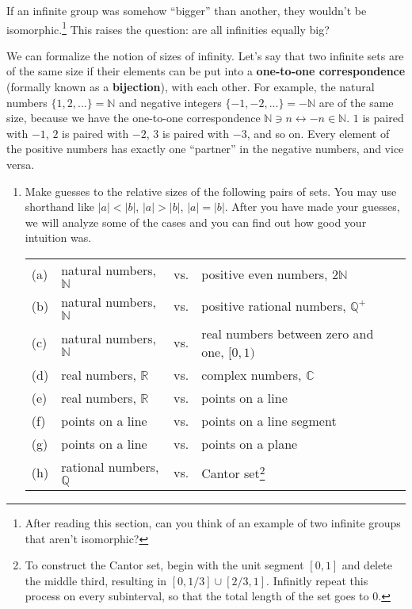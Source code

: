 \documentclass[../gatm.tex]{subfiles}
\begin{document}
If an infinite group was somehow ``bigger'' than another, they wouldn't be isomorphic.\footnote{After reading this section, can you think of an example of two infinite groups that aren't isomorphic?} This raises the question: are all infinities equally big?

We can formalize the notion of sizes of infinity. Let's say that two infinite sets are of the same size if their elements can be put into a \textbf{one-to-one correspondence} (formally known as a \textbf{bijection}), with each other. For example, the natural numbers $\{1,2,...\}=\mathbb{N}$ and negative integers $\{-1,-2,...\}=-\mathbb{N}$ are of the same size, because we have the one-to-one correspondence $\mathbb{N} \ni n\leftrightarrow -n \in \mathbb{N}$. $1$ is paired with $-1$, $2$ is paired with $-2$, $3$ is paired with $-3$, and so on. Every element of the positive numbers has exactly one ``partner'' in the negative numbers, and vice versa.

\begin{enumerate}
\setcounter{enumi}{\value{inf_problem_i}}
\item Make guesses to the relative sizes of the following pairs of sets. You may use shorthand like $|a| < |b|$, $|a| > |b|$, $|a| = |b|$. After you have made your guesses, we will analyze some of the cases and you can find out how good your intuition was.

\begin{tabular}{llll} %
(a) & natural numbers, $\mathbb{N}$ & vs. & positive even numbers, $2\mathbb{N}$ \\
(b) & natural numbers, $\mathbb{N}$ & vs. & positive rational numbers, $\mathbb{Q}^+$ \\
(c) & natural numbers, $\mathbb{N}$ & vs. & real numbers between zero and one, $[0,1)$ \\
(d) & real numbers, $\mathbb{R}$ & vs. & complex numbers, $\mathbb{C}$ \\
(e) & real numbers, $\mathbb{R}$ & vs. & points on a line \\
(f) & points on a line & vs. & points on a line segment \\
(g) & points on a line & vs. & points on a plane \\
(h) & rational numbers, $\mathbb{Q}$ & vs. & Cantor set\footnote{To construct the Cantor set, begin with the unit segment $[0,1]$ and delete the middle third, resulting in $[0,1/3] \cup [2/3, 1]$. Infinitly repeat this process on every subinterval, so that the total length of the set goes to $0$.}
\end{tabular}

\setcounter{inf_problem_i}{\value{enumi}}
\end{enumerate}
\end{document}
